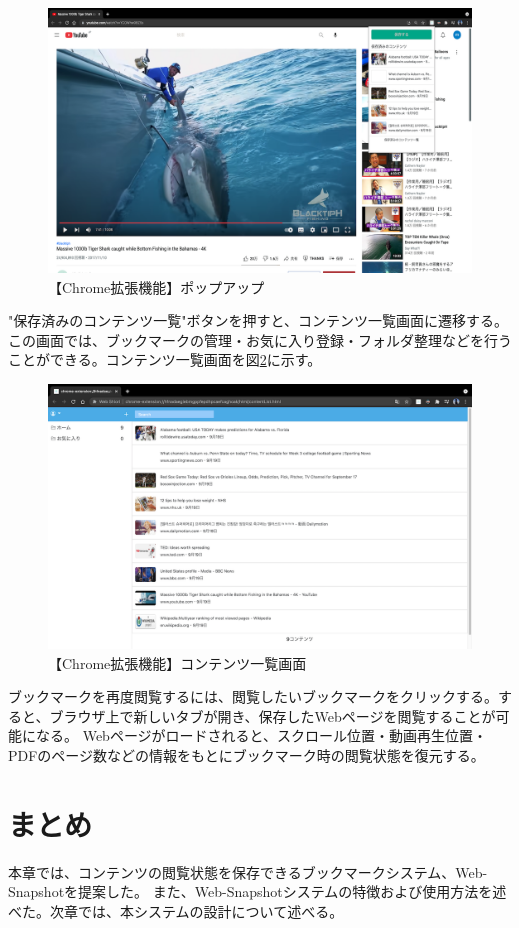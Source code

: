 \begin{figure}[htbp]
  \caption{【Chrome拡張機能】ポップアップ}
  \label{fig:usage-chrome-popup}
  \begin{center}
    \includegraphics[bb=0 0 915 667,width=15cm]{img/usage-chrome-popup.pdf}
  \end{center}
\end{figure}

"保存済みのコンテンツ一覧"ボタンを押すと、コンテンツ一覧画面に遷移する。
この画面では、ブックマークの管理・お気に入り登録・フォルダ整理などを行うことができる。コンテンツ一覧画面を図\ref{fig:usage-chrome-list}に示す。

\begin{figure}[htbp]
  \caption{【Chrome拡張機能】コンテンツ一覧画面}
  \label{fig:usage-chrome-list}
  \begin{center}
    \includegraphics[bb=0 0 915 667,width=15cm]{img/usage-chrome-list.pdf}
  \end{center}
\end{figure}

ブックマークを再度閲覧するには、閲覧したいブックマークをクリックする。すると、ブラウザ上で新しいタブが開き、保存したWebページを閲覧することが可能になる。
Webページがロードされると、スクロール位置・動画再生位置・PDFのページ数などの情報をもとにブックマーク時の閲覧状態を復元する。

\section{まとめ}
本章では、コンテンツの閲覧状態を保存できるブックマークシステム、Web-Snapshotを提案した。
また、Web-Snapshotシステムの特徴および使用方法を述べた。次章では、本システムの設計について述べる。